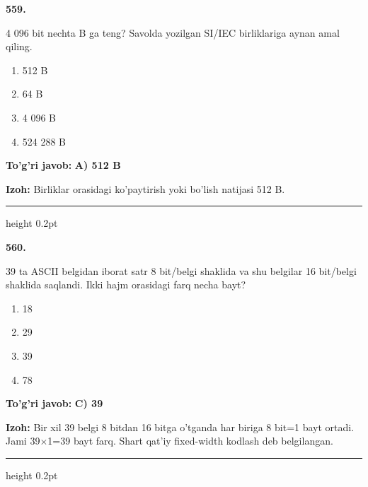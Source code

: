 \documentclass[10pt,a4paper,oneside]{article}
\begin{document}
\noindent\textbf{\color{ink}559.}
\par
4 096 bit nechta B ga teng? Savolda yozilgan SI/IEC birliklariga aynan amal qiling.
\begin{enumerate}[label=\Alph*),leftmargin=9mm]
\item 512 B
\item 64 B
\item 4 096 B
\item 524 288 B
\end{enumerate}
\begin{tcolorbox}[enhanced,breakable,colback=teal!4,colframe=teal!50!black,boxrule=0.5pt,arc=1.1mm,left=3mm,right=3mm,top=1.7mm,bottom=1.7mm,before skip=2mm,after skip=2mm]
\textbf{\color{teal}To'g'ri javob:} \textbf{A) 512 B}
\par\smallskip
\textbf{Izoh:} Birliklar orasidagi ko'paytirish yoki bo'lish natijasi 512 B.
\end{tcolorbox}
\vspace{2mm}\hrule height 0.2pt \vspace{3mm}

\noindent\textbf{\color{ink}560.}
\par
39 ta ASCII belgidan iborat satr 8 bit/belgi shaklida va shu belgilar 16 bit/belgi shaklida saqlandi. Ikki hajm orasidagi farq necha bayt?
\begin{enumerate}[label=\Alph*),leftmargin=9mm]
\item 18
\item 29
\item 39
\item 78
\end{enumerate}
\begin{tcolorbox}[enhanced,breakable,colback=teal!4,colframe=teal!50!black,boxrule=0.5pt,arc=1.1mm,left=3mm,right=3mm,top=1.7mm,bottom=1.7mm,before skip=2mm,after skip=2mm]
\textbf{\color{teal}To'g'ri javob:} \textbf{C) 39}
\par\smallskip
\textbf{Izoh:} Bir xil 39 belgi 8 bitdan 16 bitga o'tganda har biriga 8 bit=1 bayt ortadi. Jami 39\ensuremath{\times}1=39 bayt farq. Shart qat'iy fixed-width kodlash deb belgilangan.
\end{tcolorbox}
\vspace{2mm}\hrule height 0.2pt \vspace{3mm}
\end{document}
